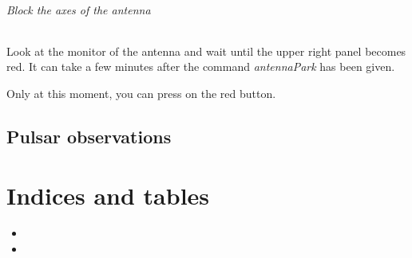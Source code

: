 \documentclass[letterpaper,10pt,english]{sphinxmanual}
\begin{document}
\subparagraph{Block the axes of the antenna}
\label{SpectralLine/L-band/SARDARA/stop-session:block-the-axes-of-the-antenna}
Look at the monitor of the antenna and wait until the upper right
panel becomes red. It can take a few minutes after the command
\emph{antennaPark} has been given.

Only at this moment, you can press on the red button.


\section{Pulsar observations}
\label{Pulsar/index:pulsar-observations}\label{Pulsar/index::doc}

\chapter{Indices and tables}
\label{index:indices-and-tables}\begin{itemize}
\item {} 

\item {} 

\end{itemize}



\renewcommand{\indexname}{Index}
\printindex
\end{document}
